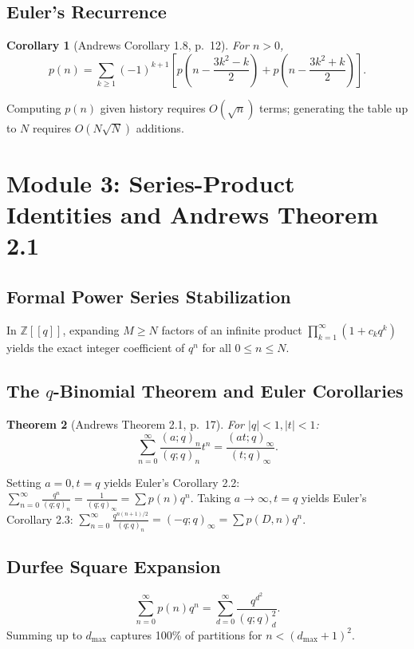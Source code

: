 \documentclass[11pt,a4paper]{article}
\newtheorem{theorem}{Theorem}[section]
\newtheorem{corollary}[theorem]{Corollary}
\begin{document}
\subsection{Euler's Recurrence}
\begin{corollary}[Andrews Corollary 1.8, p.~12]
For $n > 0$,
\begin{equation}
p(n) = \sum_{k \ge 1} (-1)^{k+1} \left[ p\left(n - \frac{3k^2-k}{2}\right) + p\left(n - \frac{3k^2+k}{2}\right) \right].
\end{equation}
\end{corollary}
Computing $p(n)$ given history requires $O(\sqrt{n})$ terms; generating the table up to $N$ requires $O(N\sqrt{N})$ additions.

\section{Module 3: Series-Product Identities and Andrews Theorem 2.1}

\subsection{Formal Power Series Stabilization}
In $\mathbb{Z}[[q]]$, expanding $M \ge N$ factors of an infinite product $\prod_{k=1}^\infty (1 + c_k q^k)$ yields the exact integer coefficient of $q^n$ for all $0 \le n \le N$.

\subsection{The $q$-Binomial Theorem and Euler Corollaries}
\begin{theorem}[Andrews Theorem 2.1, p.~17]
For $|q| < 1, |t| < 1$:
\begin{equation}
\sum_{n=0}^\infty \frac{(a; q)_n}{(q; q)_n} t^n = \frac{(at; q)_\infty}{(t; q)_\infty}.
\end{equation}
\end{theorem}
Setting $a = 0, t = q$ yields Euler's Corollary 2.2: $\sum_{n=0}^\infty \frac{q^n}{(q; q)_n} = \frac{1}{(q; q)_\infty} = \sum p(n) q^n$.
Taking $a \to \infty, t = q$ yields Euler's Corollary 2.3: $\sum_{n=0}^\infty \frac{q^{n(n+1)/2}}{(q; q)_n} = (-q; q)_\infty = \sum p(D, n) q^n$.

\subsection{Durfee Square Expansion}
\begin{equation}
\sum_{n=0}^\infty p(n) q^n = \sum_{d=0}^\infty \frac{q^{d^2}}{(q; q)_d^2}.
\end{equation}
Summing up to $d_{\max}$ captures 100\% of partitions for $n < (d_{\max}+1)^2$.
\end{document}
